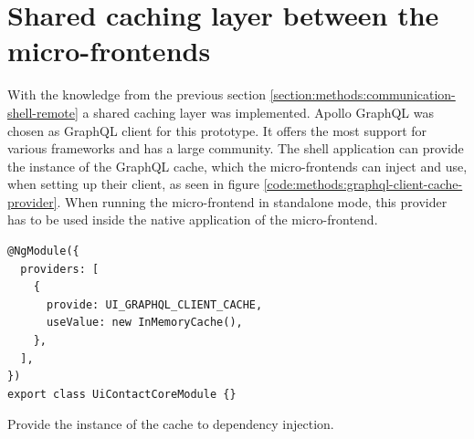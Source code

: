 
\fi

\section{Shared caching layer between the micro-frontends}

With the knowledge from the previous section \ref{section:methods:communication-shell-remote} a shared caching layer was implemented. Apollo GraphQL was chosen as GraphQL client for this prototype. It offers the most support for various frameworks and has a large community. The shell application can provide the instance of the GraphQL cache, which the micro-frontends can inject and use, when setting up their client, as seen in figure \ref{code:methods:graphql-client-cache-provider}. When running the micro-frontend in standalone mode, this provider has to be used inside the native application of the micro-frontend.

\ifshowUnusedContent
\fi

\ifshowListings
\begin{listing}[H]
\begin{verbatim}
@NgModule({
  providers: [
    {
      provide: UI_GRAPHQL_CLIENT_CACHE,
      useValue: new InMemoryCache(),
    },
  ],
})
export class UiContactCoreModule {}
\end{verbatim}
\caption{Provide the instance of the cache to dependency injection.}\label{code:methods:graphql-client-cache-provider}
\end{listing}
\fi

\ifshowUnusedContent

